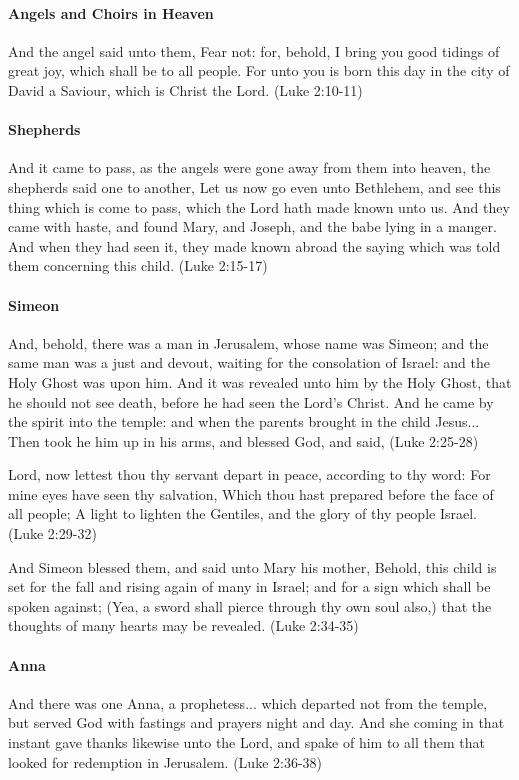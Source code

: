 \paragraph{Angels and Choirs in Heaven}
And the angel said unto them, Fear not: for, behold, I bring you good tidings of great joy, which shall be to all people. For unto you is born this day in the city of David a Saviour, which is Christ the Lord. (Luke 2:10-11)

\paragraph{Shepherds}
And it came to pass, as the angels were gone away from them into heaven, the shepherds said one to another, Let us now go even unto Bethlehem, and see this thing which is come to pass, which the Lord hath made known unto us. And they came with haste, and found Mary, and Joseph, and the babe lying in a manger. And when they had seen it, they made known abroad the saying which was told them concerning this child. (Luke 2:15-17)

\paragraph{Simeon}
And, behold, there was a man in Jerusalem, whose name was Simeon; and the same man was a just and devout, waiting for the consolation of Israel: and the Holy Ghost was upon him. And it was revealed unto him by the Holy Ghost, that he should not see death, before he had seen the Lord's Christ. And he came by the spirit into the temple: and when the parents brought in the child Jesus... Then took he him up in his arms, and blessed God, and said, (Luke 2:25-28)

Lord, now lettest thou thy servant depart in peace, according to thy word: For mine eyes have seen thy salvation, Which thou hast prepared before the face of all people; A light to lighten the Gentiles, and the glory of thy people Israel. (Luke 2:29-32)

And Simeon blessed them, and said unto Mary his mother, Behold, this child is set for the fall and rising again of many in Israel; and for a sign which shall be spoken against; (Yea, a sword shall pierce through thy own soul also,) that the thoughts of many hearts may be revealed. (Luke 2:34-35)

\paragraph{Anna}
And there was one Anna, a prophetess... which departed not from the temple, but served God with fastings and prayers night and day. And she coming in that instant gave thanks likewise unto the Lord, and spake of him to all them that looked for redemption in Jerusalem. (Luke 2:36-38)

